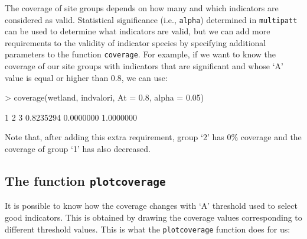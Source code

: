 \documentclass[11pt,a4paper]{article}
\begin{document}
The coverage of site groups depends on how many and which indicators are considered as valid. Statistical significance (i.e., \texttt{alpha}) determined in \texttt{multipatt} can be used to determine what indicators are valid, but we can add more requirements to the validity of indicator species by specifying additional parameters to the function \texttt{coverage}. For example, if we want to know the coverage of our site groups with indicators that are significant and whose `A' value is equal or higher than 0.8, we can use:
\begin{Schunk}
\begin{Sinput}
> coverage(wetland, indvalori, At = 0.8, alpha = 0.05)
\end{Sinput}
\begin{Soutput}
        1         2         3 
0.8235294 0.0000000 1.0000000 
\end{Soutput}
\end{Schunk}
Note that, after adding this extra requirement, group `2' has 0\% coverage and the coverage of group `1' has also decreased.

\subsection{The function \texttt{plotcoverage}}
It is  possible to know how the coverage changes with `A' threshold used to select good indicators. This is obtained by drawing the coverage values corresponding to different threshold values. This is what the \texttt{plotcoverage} function does for us:
\end{document}
